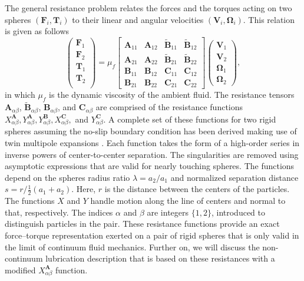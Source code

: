 \documentclass[../thesis.tex]{subfiles}
\begin{document}
The general resistance problem relates the forces and the torques acting on two spheres $(\boldsymbol{F}_i,\boldsymbol{T}_i)$ to their linear and angular velocities $(\boldsymbol{V}_i,\boldsymbol{\Omega}_i)$. This relation is given \cite[e.g.\ Equation~(1.3) in][]{JO84} as follows
\begin{equation}
{\begin{pmatrix}
\boldsymbol{F}_1 \\
\boldsymbol{F}_2 \\
\boldsymbol{T}_1 \\
\boldsymbol{T}_2 \\
\end{pmatrix}}
=\mu_f
{\begin{bmatrix}
\boldsymbol{A}_{11} & \boldsymbol{A}_{12} & \boldsymbol{\tilde{B}}_{11} & \boldsymbol{\tilde{B}}_{12} \\
\boldsymbol{A}_{21} & \boldsymbol{A}_{22} & \boldsymbol{\tilde{B}}_{21} & \boldsymbol{\tilde{B}}_{22} \\
\boldsymbol{B}_{11} & \boldsymbol{B}_{12} & \boldsymbol{C}_{11} & \boldsymbol{C}_{12} \\
\boldsymbol{B}_{21} & \boldsymbol{B}_{22} & \boldsymbol{C}_{21} & \boldsymbol{C}_{22}
\end{bmatrix}}
{\begin{pmatrix}
\boldsymbol{V}_1 \\
\boldsymbol{V}_2 \\
\boldsymbol{\Omega}_1 \\
\boldsymbol{\Omega}_2
\end{pmatrix}},
\label{eq:res}
\end{equation}
in which $\mu_f$ is the dynamic viscosity of the ambient fluid. The resistance tensors $\boldsymbol{A}_{\alpha\beta}$, $\boldsymbol{\tilde{B}}_{\alpha\beta}$, $\boldsymbol{B}_{\alpha\beta}$, and $\boldsymbol{C}_{\alpha\beta}$ are comprised of the resistance functions $X^{\boldsymbol{A}}_{\alpha\beta}, Y^{\boldsymbol{A}}_{\alpha\beta}, Y^{\boldsymbol{B}}_{\alpha\beta}, X^{\boldsymbol{C}}_{\alpha\beta},$ and $Y^{\boldsymbol{C}}_{\alpha\beta}$. A complete set of these functions for two rigid spheres assuming the no-slip boundary condition has been derived making use of twin multipole expansions \citep{JO84}. Each function takes the form of a high-order series in inverse powers of center-to-center separation. The singularities are removed using asymptotic expressions that are valid for nearly touching spheres. The functions depend on the spheres radius ratio $\lambda=a_2/a_1$ and normalized separation distance $s = r/\frac{1}{2}(a_1+a_2)$. Here, $r$ is the distance between the centers of the particles. The functions $X$ and $Y$ handle motion along the line of centers and normal to that, respectively. The indices $\alpha$ and $\beta$ are integers $\{1,2\}$, introduced to distinguish particles in the pair. These resistance functions provide an exact force--torque representation exerted on a pair of rigid spheres that is only valid in the limit of continuum fluid mechanics. Further on, we will discuss the non-continuum lubrication description that is based on these resistances with a modified $X^{\boldsymbol{A}}_{\alpha\beta}$ function.
\end{document}
